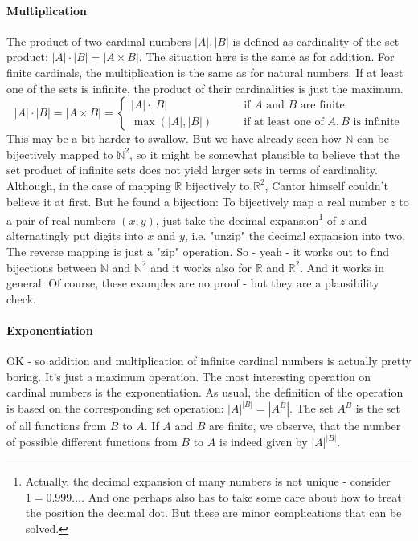 
\paragraph{Multiplication} The product of two cardinal numbers $|A|,|B|$ is defined as cardinality of the set product: $|A| \cdot |B| = |A \times B|$. The situation here is the same as for addition. For finite cardinals, the multiplication is the same as for natural numbers. If at least one of the sets is infinite, the product of their cardinalities is just the maximum.
\begin{equation}
|A| \cdot |B| = |A \times B| =
\begin{cases}
|A| \cdot |B|    \qquad &\text{if $A$ and $B$ are finite} \\
\max(|A|,|B|)   \qquad &\text{if at least one of $A, B$ is infinite}
\end{cases}
\end{equation}
This may be a bit harder to swallow. But we have already seen how $\mathbb{N}$ can be bijectively mapped to $\mathbb{N}^2$, so it might be somewhat plausible to believe that the set product of infinite sets does not yield larger sets in terms of cardinality. Although, in the case of mapping $\mathbb{R}$ bijectively to $\mathbb{R}^2$, Cantor himself couldn't believe it at first. But he found a bijection: To bijectively map a real number $z$ to a pair of real numbers $(x,y)$, just take the decimal expansion\footnote{Actually, the decimal expansion of many numbers is not unique - consider $1 = 0.999\ldots$. And one perhaps also has to take some care about how to treat the position the decimal dot. But these are minor complications that can be solved.} of $z$ and alternatingly put digits into $x$ and $y$, i.e. "unzip" the decimal expansion into two. The reverse mapping is just a "zip" operation. So - yeah - it works out to find bijections between $\mathbb{N}$ and $\mathbb{N}^2$ and it works also for  $\mathbb{R}$ and $\mathbb{R}^2$. And it works in general. Of course, these examples are no proof - but they are a plausibility check.



\paragraph{Exponentiation} OK - so addition and multiplication of infinite cardinal numbers is actually pretty boring. It's just a maximum operation. The most interesting operation on cardinal numbers is the exponentiation. As usual, the definition of the operation is based on the corresponding set operation: $|A|^{|B|} = |A^B|$. The set $A^B$ is the set of all functions from $B$ to $A$. If $A$ and $B$ are finite, we observe, that the number of possible different functions from $B$ to $A$ is indeed given by $|A|^{|B|}$.




